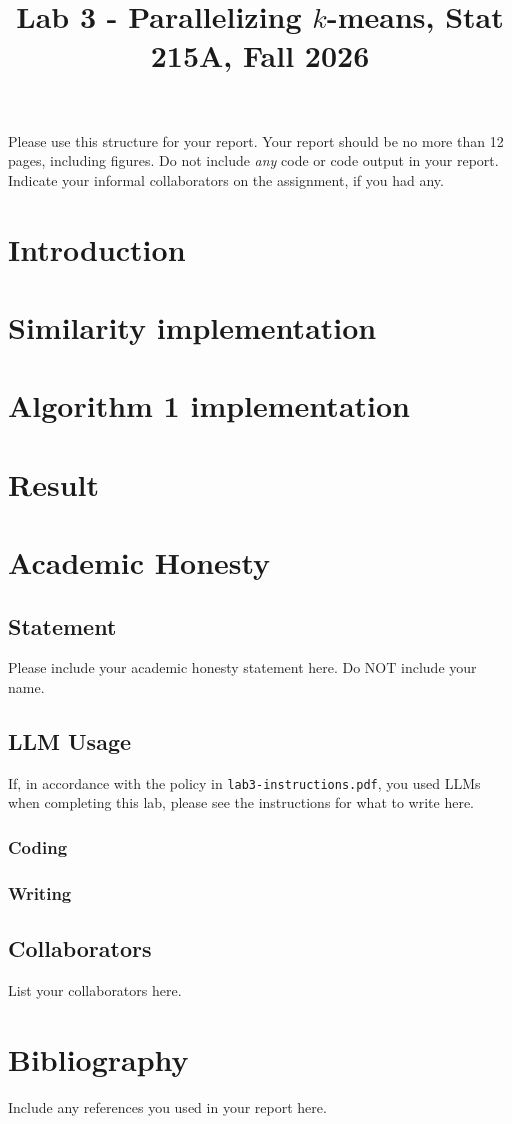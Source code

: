 \documentclass[10pt,letterpaper]{article}
\title{Lab 3 - Parallelizing $k$-means, Stat 215A, Fall 2026\vspace{-2em}}
\begin{document}
\maketitle

Please use this structure for your report. Your report should be no more than 12 pages, including figures. Do not include \emph{any} code or code output in your report. Indicate your informal collaborators on the assignment, if you had any.

\section{Introduction}\label{introduction}

\section{Similarity implementation}

\section{Algorithm 1 implementation}

\section{Result}

\section{Academic Honesty}

\subsection{Statement}
Please include your academic honesty statement here. Do NOT include your name.

\subsection{LLM Usage}
If, in accordance with the policy in \texttt{lab3-instructions.pdf}, you used LLMs when completing this lab, please see the instructions for what to write here.

\subsubsection*{Coding}

\subsubsection*{Writing}

\subsection{Collaborators}
List your collaborators here.
\section{Bibliography}
Include any references you used in your report here.
\end{document}
